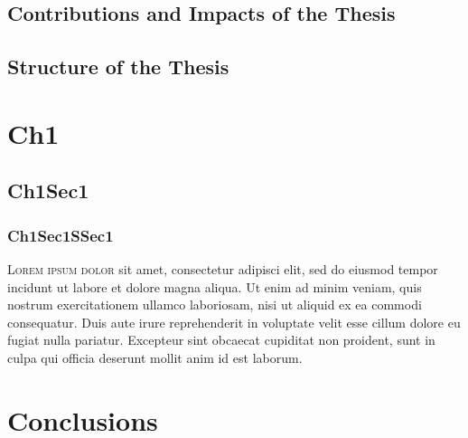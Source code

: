 \documentclass{unicam_thesis}
\theoremstyle{definition} \newtheorem{esempio}{Esempio}[chapter]
\theoremstyle{definition}
\begin{document}
    \section{Contributions and Impacts of the Thesis}
    
    
    
    \section{Structure of the Thesis}
    
    \chapter{Ch1}
   
    \section{Ch1Sec1}
    \label{ch1s10}
    \subsection{Ch1Sec1SSec1}
     \textsc{Lorem ipsum dolor} sit amet, consectetur adipisci elit, sed do eiusmod tempor incidunt ut labore et dolore magna aliqua. Ut enim ad minim veniam, quis nostrum exercitationem ullamco laboriosam, nisi ut aliquid ex ea commodi consequatur. Duis aute irure reprehenderit in voluptate velit esse cillum dolore eu fugiat nulla pariatur. Excepteur sint obcaecat cupiditat non proident, sunt in culpa qui officia deserunt mollit anim id est laborum.
     
     
     
     
    
    \chapter{Conclusions}\label{chap:conc}
   
\end{document}

